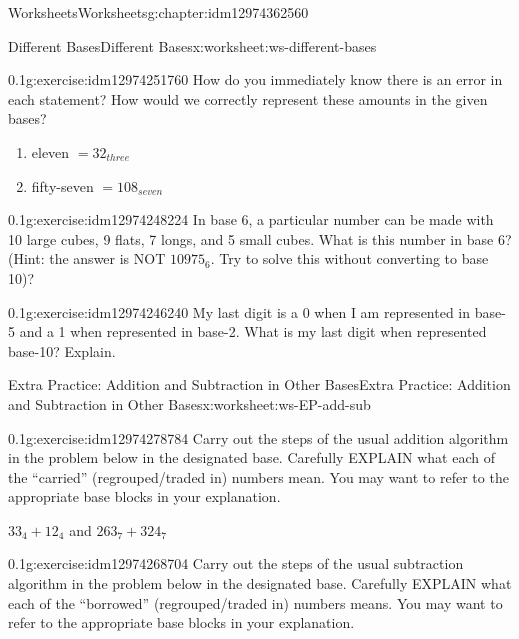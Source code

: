 \documentclass[twoside,11pt,]{book}
\begin{document}
\begin{chapterptx}{Worksheets}{}{Worksheets}{}{}{g:chapter:idm12974362560}
\begin{worksheet-section-numberless}{Different Bases}{}{Different Bases}{}{}{x:worksheet:ws-different-bases}
\begin{divisionexercise}{5}{}{0.1}{g:exercise:idm12974251760}
How do you immediately know there is an error in each statement?  How would we correctly represent these amounts in the given bases?%
%
\begin{enumerate}[label=(\alph*)]
\item{}eleven \(= 32_{three}\)%
\item{}fifty-seven \(= 108_{seven}\)%
\end{enumerate}
\end{divisionexercise}%
\begin{divisionexercise}{6}{}{0.1}{g:exercise:idm12974248224}%
In base 6, a particular number can be made with 10 large cubes, 9 flats, 7 longs, and 5 small cubes.  What is this number in base 6? (Hint: the answer is NOT \(10975_6 \). Try to solve this without converting to base 10)?%
\end{divisionexercise}%
\begin{divisionexercise}{7}{}{0.1}{g:exercise:idm12974246240}%
My last digit is a 0 when I am represented in base-5 and a 1 when represented in base-2.  What is my last digit when represented base-10? Explain.%
\end{divisionexercise}%
\end{worksheet-section-numberless}
\restoregeometry
%
%
\typeout{************************************************}
\typeout{************************************************}
%
\begin{worksheet-section-numberless}{Extra Practice: Addition and Subtraction in Other Bases}{}{Extra Practice: Addition and Subtraction in Other Bases}{}{}{x:worksheet:ws-EP-add-sub}
\begin{divisionexercise}{1}{}{0.1}{g:exercise:idm12974278784}%
Carry out the steps of the usual addition algorithm in the problem below in the designated base.  Carefully EXPLAIN what each of the “carried” (regrouped\slash{}traded in) numbers mean.  You may want to refer to the appropriate base blocks in your explanation.%
\par
\(33_4+12_4\) and \(263_7+324_7\)%
\end{divisionexercise}%
\begin{divisionexercise}{2}{}{0.1}{g:exercise:idm12974268704}%
Carry out the steps of the usual subtraction algorithm in the problem below in the designated base.  Carefully EXPLAIN what each of the “borrowed” (regrouped\slash{}traded in) numbers means.  You may want to refer to the appropriate base blocks in your explanation.%

\end{divisionexercise}
\end{worksheet-section-numberless}
\end{chapterptx}
\end{document}
